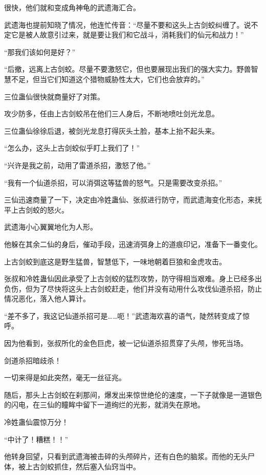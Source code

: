 \begin{this_body}
很快，他们就和变成角神龟的武遗海汇合。

武遗海也提前知晓了情况，他连忙传音：“尽量不要和这头上古剑蛟纠缠了。说不定它是被人故意引过来，就是要让我们和它战斗，消耗我们的仙元和战力！”

“那我们该如何是好？”

“后撤，远离上古剑蛟。尽量不要激怒它，但也要展现出我们的强大实力。野兽智慧不足，但当它们知道这个猎物威胁性太大，它们也会放弃的。”

三位蛊仙很快就商量好了对策。

攻少防多，任由上古剑蛟吊在他们三人身后，不断地喷吐剑光龙息。

三位蛊仙徐徐后退，被剑光龙息打得灰头土脸，基本上抬不起头来。

“怎么办，这头上古剑蛟似乎盯上我们了！”

“兴许是我之前，动用了雷道杀招，激怒了他。”

“我有一个仙道杀招，可以消弭这等猛兽的怒气。只是需要改变杀招。”

三仙迅速商量了一下，决定由冷姓蛊仙、张叔进行防守，而武遗海变化形态，来抚平上古剑蛟的怒火。

武遗海小心翼翼地化为人形。

他躲在其余二仙的身后，催动手段，迅速消弭身上的道痕印记，准备下一番变化。

上古剑蛟到底这是野生猛兽，智慧低下，一味地朝着巨狼和金虎攻击。

张叔和冷姓蛊仙因此承受了上古剑蛟的猛烈攻势，防守得相当艰难。身上已经多出负伤，但为了尽快将这头上古剑蛟赶走，他们并没有动用什么攻伐仙道杀招，防止情况恶化，落入他人算计。

“差不多了，我这记仙道杀招可是……呃！”武遗海欢喜的语气，陡然转变成了惊呼。

因为他看到，张叔所化的金色巨虎，被一记仙道杀招贯穿了头颅，惨死当场。

剑道杀招暗歧杀！

一切来得是如此突然，毫无一丝征兆。

随后，那头上古剑蛟在刹那间，爆发出来惊世绝伦的速度，一下子就像是一道银色的闪电，在三仙的瞳眸中留下一道绚烂的光影，就消失在原地。

冷姓蛊仙震惊万分！

“中计了！糟糕！！”

他转身回望，只看到武遗海被击碎的头颅碎片，还有白色的脑浆。而他的无头尸体，被上古剑蛟抓住，然后塞入仙窍当中。

\end{this_body}


